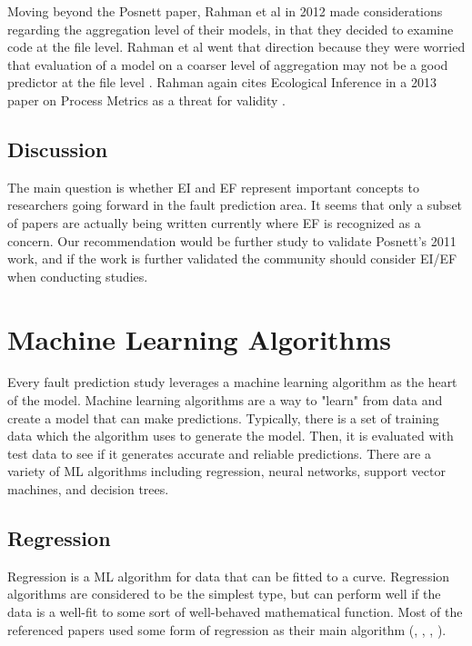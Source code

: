 \documentclass{sig-alternate-05-2015}
\begin{document}
Moving beyond the Posnett paper, Rahman et al in 2012 made considerations regarding the aggregation level of their models, in that they decided to examine code at the file level.  Rahman et al went that direction because they were worried that evaluation of a model on a coarser level of aggregation may not be a good predictor at the file level \cite{Rahman}.  Rahman again cites Ecological Inference in a 2013 paper on Process Metrics as a threat for validity \cite{Rahman13}.  

\subsection{Discussion}
The main question is whether EI and EF represent important concepts to researchers going forward in the fault prediction area.  It seems that only a subset of papers are actually being written currently where EF is recognized as a concern.  Our recommendation would be further study to validate Posnett's 2011 work, and if the work is further validated the community should consider EI/EF when conducting studies.


\section{Machine Learning Algorithms}

Every fault prediction study leverages a machine learning algorithm as the heart of the model. Machine learning algorithms are a way to "learn" from data and create a model that can make predictions. Typically, there is a set of training data which the algorithm uses to generate the model. Then, it is evaluated with test data to see if it generates accurate and reliable predictions. There are a variety of ML algorithms including regression, neural networks, support vector machines, and decision trees.

\subsection{Regression}
Regression is a ML algorithm for data that can be fitted to a curve. Regression algorithms are considered to be the simplest type, but can perform well if the data is a well-fit to some sort of well-behaved mathematical function. Most of the referenced papers used some form of regression as their main algorithm (\cite{Posnett}, \cite{Bird}, \cite{Nagappan}, \cite{Rahman}). 
\end{document}
